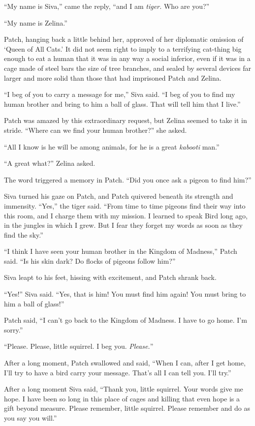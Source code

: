 \documentclass[12pt]{memoir}
\begin{document}
“My name is Siva,” came the reply, “and I am \textit{tiger.} Who are
you?”

“My name is Zelina.”

Patch, hanging back a little behind her, approved of her diplomatic
omission of ‘Queen of All Cats.’ It did not seem right to imply to a
terrifying cat-thing big enough to eat a human that it was in any way
a social inferior, even if it was in a cage made of steel bars the
size of tree branches, and sealed by several devices far larger and
more solid than those that had imprisoned Patch and Zelina.

“I beg of you to carry a message for me,” Siva said. “I beg of you to
find my human brother and bring to him a ball of glass. That will tell
him that I live.”

Patch was amazed by this extraordinary request, but Zelina seemed to
take it in stride. “Where can we find your human brother?” she asked.

“All I know is he will be among animals, for he is a great
\textit{kabooti} man.”

“A great what?” Zelina asked.

The word triggered a memory in Patch. “Did you once ask a pigeon to
find him?”

Siva turned his gaze on Patch, and Patch quivered beneath its strength
and immensity. “Yes,” the tiger said. “From time to time pigeons find
their way into this room, and I charge them with my mission. I learned
to speak Bird long ago, in the jungles in which I grew. But I fear
they forget my words as soon as they find the sky.”

“I think I have seen your human brother in the Kingdom of Madness,”
Patch said. “Is his skin dark? Do flocks of pigeons follow him?”

Siva leapt to his feet, hissing with excitement, and Patch shrank
back.

“Yes!” Siva said. “Yes, that is him! You must find him again! You must
bring to him a ball of glass!”

Patch said, “I can’t go back to the Kingdom of Madness. I have to go
home. I’m sorry.”

“Please. Please, little squirrel. I beg you. \textit{Please.}”

After a long moment, Patch swallowed and said, “When I can, after I
get home, I’ll try to have a bird carry your message. That’s all I can
tell you. I’ll try.”

After a long moment Siva said, “Thank you, little squirrel. Your words
give me hope. I have been so long in this place of cages and killing
that even hope is a gift beyond measure. Please remember, little
squirrel. Please remember and do as you say you will.”
\end{document}
